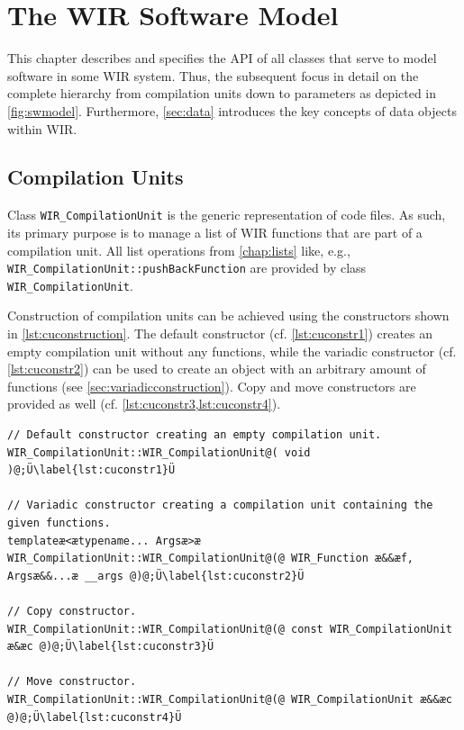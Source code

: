\chapter{The WIR Software Model}
\label{chap:swmodel}
\renewcommand{\sectiontitle}{}

This chapter describes and specifies the \gls{API} of all classes that serve to model software in some \gls{WIR} system.
Thus, the subsequent  focus in detail on the complete hierarchy from compilation units down to parameters as depicted in \cref{fig:swmodel}.
Furthermore, \cref{sec:data} introduces the key concepts of data objects within \gls{WIR}.


\section{Compilation Units}
\label{sec:compilationunits}

Class \texttt{WIR\_CompilationUnit} is the generic representation of code files.
As such, its primary purpose is to manage a list of \gls{WIR} functions that are part of a compilation unit.
All list operations from \cref{chap:lists} like, e.g., \texttt{WIR\_CompilationUnit::pushBackFunction} are provided by class \texttt{WIR\_CompilationUnit}.

Construction of compilation units can be achieved using the constructors shown in \cref{lst:cuconstruction}.
The default constructor (cf. \cref{lst:cuconstr1}) creates an empty compilation unit without any functions, while the variadic constructor (cf.  \cref{lst:cuconstr2}) can be used to create an object with an arbitrary amount of functions (see \cref{sec:variadicconstruction}).
Copy and move constructors are provided as well (cf. \cref{lst:cuconstr3,lst:cuconstr4}).

\begin{lstlisting}[style=code,float=ht,caption={Constructors of Class \texttt{WIR\_CompilationUnit}},label=lst:cuconstruction]
// Default constructor creating an empty compilation unit.
WIR_CompilationUnit::WIR_CompilationUnit@( void )@;Ü\label{lst:cuconstr1}Ü

// Variadic constructor creating a compilation unit containing the given functions.
templateæ<ætypename... Argsæ>æ WIR_CompilationUnit::WIR_CompilationUnit@(@ WIR_Function æ&&æf, Argsæ&&...æ __args @)@;Ü\label{lst:cuconstr2}Ü

// Copy constructor.
WIR_CompilationUnit::WIR_CompilationUnit@(@ const WIR_CompilationUnit æ&æc @)@;Ü\label{lst:cuconstr3}Ü

// Move constructor.
WIR_CompilationUnit::WIR_CompilationUnit@(@ WIR_CompilationUnit æ&&æc @)@;Ü\label{lst:cuconstr4}Ü
\end{lstlisting}

